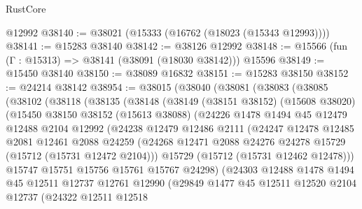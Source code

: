 \begin{lexlean}{RustCore}
\begin{coremodule}
    @12992
@38140 := @38021 (@15333 (@16762 (@18023 (@15343 @12993))))
@38141 := @15283 @38140
@38142 := @38126 @12992
@38148 := @15566 (fun (Γ : @15313) => @38141 (@38091 (@18030 @38142))) @15596
@38149 := @15450 @38140
@38150 := @38089 @16832
@38151 := @15283 @38150
@38152 := @24214 @38142
@38954 := @38015
    (@38040
      (@38081
        (@38083
          (@38085
            (@38102
              (@38118
                (@38135
                  (@38148
                    (@38149
                      (@38151 @38152)
                      (@15608 @38020)
                      (@15450
                        @38150
                        @38152
                        (@15613 @38088)
                        (@24226
                          @1478
                          @1494
                          @45
                          @12479
                          @12488
                          @2104
                          @12992
                          (@24238
                            @12479
                            @12486
                            @2111
                            (@24247
                              @12478
                              @12485
                              @2081
                              @12461
                              @2088
                              @24259
                              (@24268
                                @12471
                                @2088
                                @24276
                                @24278
                                @15729
                                (@15712 (@15731 @12472 @2104)))
                              @15729
                              (@15712 (@15731 @12462 @12478)))
                            @15747
                            @15751
                            @15756
                            @15761
                            @15767
                            @24298)
                          (@24303
                            @12488
                            @1478
                            @1494
                            @45
                            @12511
                            @12737
                            @12761
                            @12990
                            (@29849
                              @1477
                              @45
                              @12511
                              @12520
                              @2104
                              @12737
                              (@24322
                                @12511
                                @12518

\end{coremodule}
\end{lexlean}
